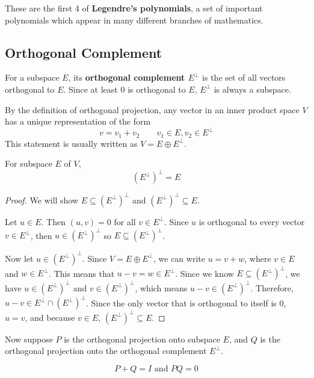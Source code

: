 These are the first 4 of \textbf{Legendre's polynomials}, a set of important polynomials which appear in many different branches of mathematics. 

\subsection{Orthogonal Complement}
\begin{definition}
For a subspace $E$, its \textbf{orthogonal complement $E^{\perp}$} is the set of all vectors orthogonal to $E$. Since at least 0 is orthogonal to $E$, $E^{\perp}$ is always a subspace. 
\end{definition}

By the definition of orthogonal projection, any vector in an inner product space $V$ has a unique representation of the form 
$$v = v_{1} + v_{2} \qquad v_{1} \in E, v_{2} \in E^{\perp}$$
This statement is usually written as $V = E \oplus E^{\perp}$.

\begin{theorem}
For subspace $E$ of $V$, 
$$(E^{\perp})^{\perp} = E$$
\end{theorem}

\begin{proof}
We will show $E \subseteq (E^{\perp})^{\perp}$ and $(E^{\perp})^{\perp} \subseteq E$.

Let $u \in E$. Then $(u, v) = 0$ for all $v \in E^{\perp}$. Since $u$ is orthogonal to every vector $v \in E^{\perp}$, then $u \in (E^{\perp})^{\perp}$ so $E \subseteq (E^{\perp})^{\perp}$. 

Now let $u \in (E^{\perp})^{\perp}$. Since $V = E \oplus E^{\perp}$, we can write $u = v + w$, where $v \in E$ and $w \in E^{\perp}$. This means that $u - v = w \in E^{\perp}$. Since we know $E \subseteq (E^{\perp})^{\perp}$, we have $u \in  (E^{\perp})^{\perp}$ and $v \in (E^{\perp})^{\perp}$, which means $u - v \in  (E^{\perp})^{\perp}$. Therefore, $u - v \in E^{\perp} \cap (E^{\perp})^{\perp}$. Since the only vector that is orthogonal to itself is 0, $u = v$, and because $v \in E$, $(E^{\perp})^{\perp} \subseteq E$. 
\end{proof}

Now suppose $P$ is the orthogonal projection onto subspace $E$, and $Q$ is the orthogonal projection onto the orthogonal complement $E^{\perp}$. 

\begin{lemma}
$$ P + Q = I \text{ and } PQ = 0$$ 
\end{lemma}

